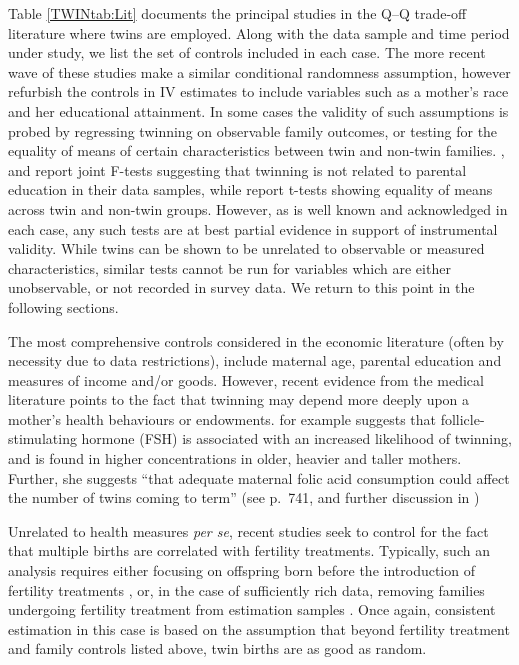\documentclass[subeqn]{article}
\begin{document}
\begin{spacing}{1.4}
Table \ref{TWINtab:Lit} documents the principal studies in the Q--Q trade-off 
literature where twins are employed.  Along with the data sample and time period 
under study, we list the set of controls included in each case.  The more recent
wave of these studies make a similar conditional randomness assumption, however
refurbish the controls in IV estimates to include variables such as a mother's 
race and her educational attainment.  In some cases the validity of such 
assumptions is probed by regressing twinning on observable family outcomes, or 
testing for the equality of means of certain characteristics between twin and
non-twin families. \citet{Blacketal2005}, \citet{Lietal2008} and 
\citet{Sanhueza2009} report joint F-tests suggesting that twinning is not related 
to parental education in their data samples, while \citet{RosenzweigZhang2009} 
report t-tests showing equality of means across twin and non-twin groups. 
However, as is well known and acknowledged in each case, any such tests are at 
best partial evidence in support of instrumental validity. While twins can be 
shown to be unrelated to observable or measured characteristics, similar tests 
cannot be run for variables which are either unobservable, or not recorded in 
survey data. We return to this point in the following sections.

The most comprehensive controls considered in the economic literature (often by
necessity due to data restrictions), include maternal age, parental education
and measures of income and/or goods.  However, recent evidence from the medical
literature points to the fact that twinning may depend more deeply upon a 
mother's health behaviours or endowments. \citet{Hall2003} for example suggests 
that follicle-stimulating hormone (FSH) is associated with an increased 
likelihood of twinning, and is found in higher concentrations in older, heavier 
and taller mothers. Further, she suggests ``that adequate maternal folic acid 
consumption could affect the number of twins coming to term'' (see p.\ 741, and 
further discussion in \citet{Lietal2003})

Unrelated to health measures \emph{per se}, recent studies seek to control for 
the fact that multiple births are correlated with fertility treatments. 
Typically, such an analysis requires either focusing on offspring born before
the introduction of fertility treatments \citep{Caceres2006,Angristetal2010}, 
or, in the case of sufficiently rich data, removing families undergoing fertility 
treatment from estimation samples \citep{Braakman2014}. Once again, consistent 
estimation in this case is based on the assumption that beyond fertility 
treatment and family controls listed above, twin births are as good as random.


\end{spacing}
\end{document}

